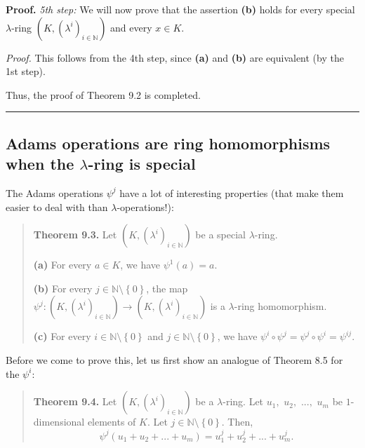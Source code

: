 \documentclass[numbers=enddot,12pt,final,onecolumn,notitlepage]{scrartcl}%
\newenvironment{proof}[1][Proof]{\noindent\textbf{#1.} }{\ \rule{0.5em}{0.5em}}
\begin{document}
\begin{proof}
\textit{5th step:} We will now prove that the assertion \textbf{(b)} holds for
every special $\lambda$-ring $\left(  K,\left(  \lambda^{i}\right)
_{i\in\mathbb{N}}\right)  $ and every $x\in K$.

\textit{Proof.} This follows from the 4th step, since \textbf{(a)} and
\textbf{(b)} are equivalent (by the 1st step).

Thus, the proof of Theorem 9.2 is completed.
\end{proof}

\subsection{Adams operations are ring homomorphisms when the $\lambda$-ring is
special}

The Adams operations $\psi^{j}$ have a lot of interesting properties (that
make them easier to deal with than $\lambda$-operations!):

\begin{quote}
\textbf{Theorem 9.3.} Let $\left(  K,\left(  \lambda^{i}\right)
_{i\in\mathbb{N}}\right)  $ be a special $\lambda$-ring.

\textbf{(a)} For every $a\in K$, we have $\psi^{1}\left(  a\right)  =a$.

\textbf{(b)} For every $j\in\mathbb{N}\setminus\left\{  0\right\}  $, the map
$\psi^{j}:\left(  K,\left(  \lambda^{i}\right)  _{i\in\mathbb{N}}\right)
\rightarrow\left(  K,\left(  \lambda^{i}\right)  _{i\in\mathbb{N}}\right)  $
is a $\lambda$-ring homomorphism.

\textbf{(c)} For every $i\in\mathbb{N}\setminus\left\{  0\right\}  $ and
$j\in\mathbb{N}\setminus\left\{  0\right\}  $, we have $\psi^{i}\circ\psi
^{j}=\psi^{j}\circ\psi^{i}=\psi^{ij}$.
\end{quote}

Before we come to prove this, let us first show an analogue of Theorem 8.5 for
the $\psi^{i}$:

\begin{quote}
\textbf{Theorem 9.4.} Let $\left(  K,\left(  \lambda^{i}\right)
_{i\in\mathbb{N}}\right)  $ be a $\lambda$-ring. Let $u_{1},$ $u_{2},$ $...,$
$u_{m}$ be $1$-dimensional elements of $K$. Let $j\in\mathbb{N}\setminus
\left\{  0\right\}  $. Then,%
\[
\psi^{j}\left(  u_{1}+u_{2}+...+u_{m}\right)  =u_{1}^{j}+u_{2}^{j}%
+...+u_{m}^{j}.
\]



\end{quote}
\end{document}
